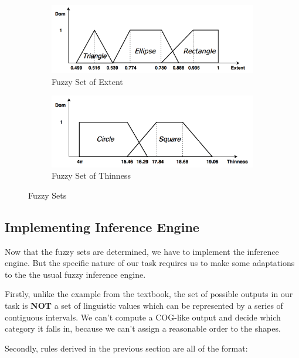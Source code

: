 \begin{figure}

\begin{subfigure}[b]{\columnwidth}
\includegraphics[width=\columnwidth]{Figure_3_Fuzzy_Sets_1.png}
\caption{Fuzzy Set of Extent}\end{subfigure}

\begin{subfigure}[b]{\columnwidth}
\includegraphics[width=\columnwidth]{Figure_4_Fuzzy_Sets_2.png}
\caption{Fuzzy Set of Thinness}
\end{subfigure}

\caption{Fuzzy Sets}

\end{figure}

\subsection{Implementing Inference Engine}

Now that the fuzzy sets are determined, we have to implement the inference engine. But the specific nature of our task requires us to make some adaptations to the the usual fuzzy inference engine.

Firstly, unlike the example from the textbook, the set of possible outputs in our task is \textbf{NOT} a set of linguistic values which can be represented by a series of contiguous intervals. We can't compute a COG-like output and decide which category it falls in, because we can't assign a reasonable order to the shapes.

Secondly, rules derived in the previous section are all of the format:

